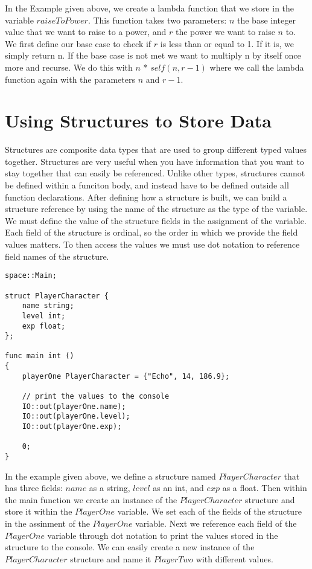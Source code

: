 \documentclass{article}
\begin{document}
In the Example given above, we create a lambda function that we store in the variable $raiseToPower$. This function takes two parameters: $n$ the base integer value
that we want to raise to a power, and $r$ the power we want to raise $n$ to. We first define our base case to check if $r$ is less than or equal to 1. If it is,
we simply return n. If the base case is not met we want to multiply n by itself once more and recurse. We do this with $n$ * $self(n,r-1)$ where we call the
lambda function again with the parameters $n$ and $r-1$.


\section{Using Structures to Store Data}

Structures are composite data types that are used to group different typed values together. Structures are very useful when you have information that you want to stay
together that can easily be referenced. Unlike other types, structures cannot be defined within a funciton body, and instead have to be defined outside all
function declarations. After defining how a structure is built, we can build a structure reference by using the name of the structure as the type of the variable. We must
define the value of the structure fields in the assignment of the variable. Each field of the structure is ordinal, so the order in which we provide
the field values matters. To then access the values we must use dot notation to reference field names of the structure.

\begin{lstlisting}
space::Main;

struct PlayerCharacter {
	name string;
	level int;
	exp float;
};

func main int ()
{
	playerOne PlayerCharacter = {"Echo", 14, 186.9};

	// print the values to the console
	IO::out(playerOne.name);
	IO::out(playerOne.level);
	IO::out(playerOne.exp);

	0;
}
\end{lstlisting}

In the example given above, we define a structure named $PlayerCharacter$ that has three fields: $name$ as a string, $level$ as an int, and $exp$
as a float. Then within the main function we create an instance of the $PlayerCharacter$ structure and store it within the $PlayerOne$ variable.
We set each of the fields of the structure in the assinment of the $PlayerOne$ variable. Next we reference each field of the $PlayerOne$ variable
through dot notation to print the values stored in the structure to the console. We can easily create a new instance of the $PlayerCharacter$ structure
and name it $PlayerTwo$ with different values.
\end{document}
